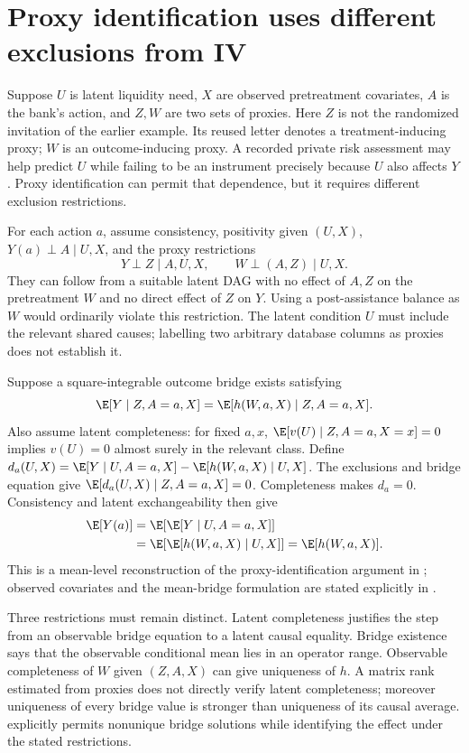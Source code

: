 \section{Proxy identification uses different exclusions from IV}
\label{r3:proxy-identification}
Suppose $U$ is latent liquidity need, $X$ are observed pretreatment
covariates, $A$ is the bank's action, and $Z,W$ are two sets of proxies.
Here $Z$ is not the randomized invitation of the earlier example.
Its reused letter denotes a treatment-inducing proxy; $W$ is an
outcome-inducing proxy. A recorded private risk assessment may help
predict $U$ while failing to be an instrument precisely because $U$
also affects $Y$. Proxy identification can permit that dependence,
but it requires different exclusion restrictions.

For each action $a$, assume consistency, positivity given $(U,X)$,
$Y(a)\perp A\mid U,X$, and the proxy restrictions
\[
 Y\perp Z\mid A,U,X,\qquad W\perp(A,Z)\mid U,X.
\]
They can follow from a suitable latent DAG with no effect of $A,Z$
on the pretreatment $W$ and no direct effect of $Z$ on $Y$.
Using a post-assistance balance as $W$ would ordinarily violate this
restriction. The latent condition $U$ must include the relevant shared
causes; labelling two arbitrary database columns as proxies does not
establish it.

Suppose a square-integrable outcome bridge exists satisfying
\begin{equation}
 \E[Y\mid Z,A=a,X]=\E[h(W,a,X)\mid Z,A=a,X].
 \label{r3:outcome-bridge}
\end{equation}
Also assume latent completeness: for fixed $a,x$,
$\E[v(U)\mid Z,A=a,X=x]=0$ implies $v(U)=0$ almost surely
in the relevant class. Define
$d_a(U,X)=\E[Y\mid U,A=a,X]-\E[h(W,a,X)\mid U,X]$.
The exclusions and bridge equation give
$\E[d_a(U,X)\mid Z,A=a,X]=0$. Completeness makes $d_a=0$.
Consistency and latent exchangeability then give
\begin{align}
 \E[Y(a)]&=\E[\E[Y\mid U,A=a,X]]\nonumber\\
 &=\E[\E[h(W,a,X)\mid U,X]]
  =\E[h(W,a,X)].
 \label{r3:proximal-mean}
\end{align}
This is a mean-level reconstruction of the proxy-identification
argument in \citet[Sections 2--3 and Theorem 1]{miao2018}; observed
covariates and the mean-bridge formulation are stated explicitly in
\citet[Section 4, Assumptions 4--6 and Theorem 3]{ghassami2022}.

Three restrictions must remain distinct. Latent completeness justifies
the step from an observable bridge equation to a latent causal equality.
Bridge existence says that the observable conditional mean lies in an
operator range. Observable completeness of $W$ given $(Z,A,X)$ can
give uniqueness of $h$. A matrix rank estimated from proxies does not
directly verify latent completeness; moreover uniqueness of every
bridge value is stronger than uniqueness of its causal average.
\citet{miao2018} explicitly permits nonunique bridge solutions while
identifying the effect under the stated restrictions.

